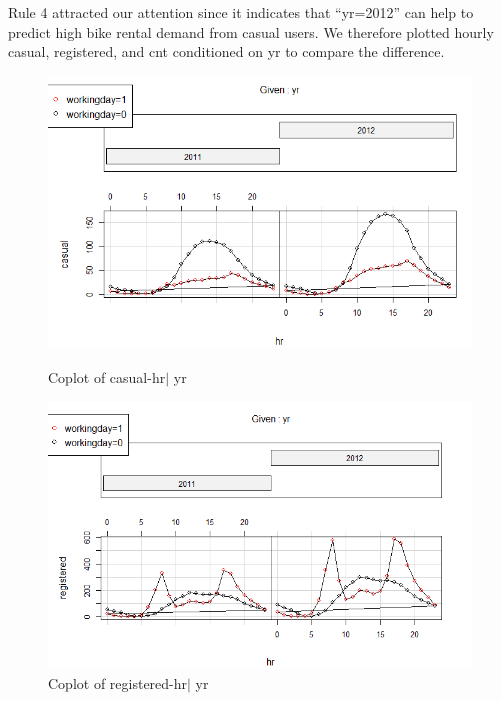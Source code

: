 \documentclass[12pt]{article}
\begin{document}
	Rule 4 attracted our attention since it indicates that ``yr=2012'' can help to predict high bike rental demand from casual users. We therefore plotted hourly casual, registered, and cnt conditioned on yr to compare the difference. 
	
	\begin{figure}[H]
		\centering
		\begin{minipage}{.48\textwidth}
			\centering
			\includegraphics[width=\linewidth]{figures/casual_yr.png}
			\caption{Coplot of casual-hr$|$ yr}
		\end{minipage}%
		\begin{minipage}{.48\textwidth}
			\centering
			\includegraphics[width=\linewidth]{figures/registered_yr.png}
			\caption{Coplot of registered-hr$|$ yr}
		\end{minipage}
	\end{figure}
	
\end{document}
